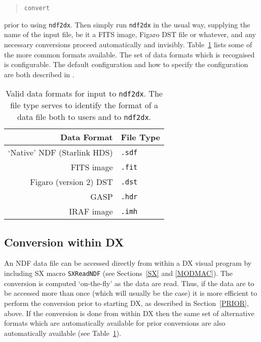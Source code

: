 \begin{quote}
{\tt convert}
\end{quote}

prior to using {\tt ndf2dx}. Then simply run {\tt ndf2dx} in the
usual way, supplying the name of the input file, be it a FITS image,
Figaro DST file or whatever, and any necessary conversions proceed
automatically and invisibly. Table~\ref{FORMATS} lists some of the
more common formats available. The set of data formats which is
recognised is configurable. The default configuration and how to specify
the configuration are both described in
\cite{SUN55}.

\begin{table}[htbp]

\begin{center}
\begin{tabular}{rl}
Data Format                  & File Type \\ \hline
`Native' NDF (Starlink HDS)  & {\tt .sdf}  \\
FITS image                   & {\tt .fit}  \\
Figaro (version 2) DST       & {\tt .dst}  \\
GASP                         & {\tt .hdr}  \\
IRAF image                   & {\tt .imh}  \\
\end{tabular}

\caption[Valid data formats for input to {\tt ndf2dx}.]
{Valid data formats for input to {\tt ndf2dx}. The file type serves to
identify the format of a data file both to users and to {\tt ndf2dx}.
\label{FORMATS} }

\end{center}
\end{table}

\subsection{Conversion within DX}

An NDF data file can be accessed directly from within a DX visual
program by including SX macro {\tt SXReadNDF} (see Sections~\ref{SX} and
\ref{MODMAC}). The conversion is computed `on-the-fly' as the data are
read. Thus, if the data are to be accessed more than once (which will
usually be the case) it is more efficient to perform the conversion
prior to starting DX, as described in Section~\ref{PRIOR}, above.
If the conversion is done from within DX then the same set of 
alternative formats which are automatically available for prior
conversions are also automatically available (see Table~\ref{FORMATS}).


